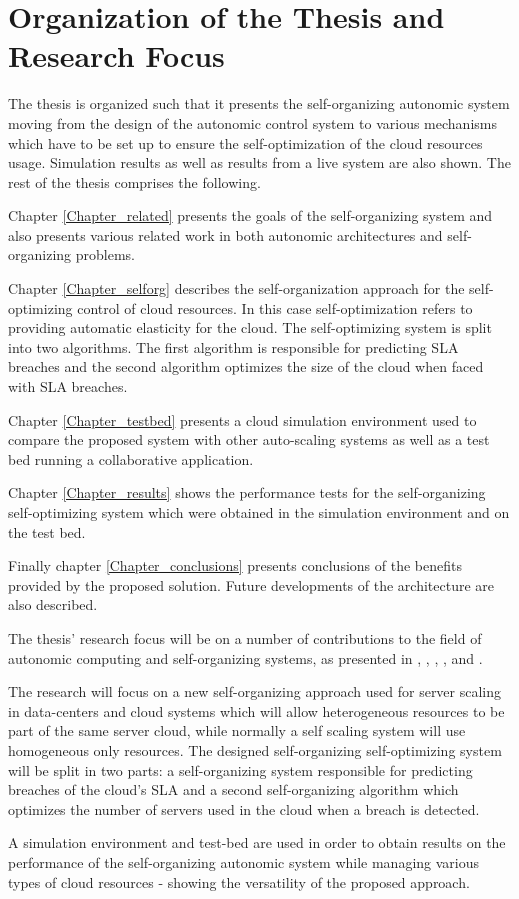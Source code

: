 \section{Organization of the Thesis and Research Focus}

The thesis is organized such that it presents the self-organizing autonomic system moving from the design of the autonomic control system to various mechanisms which have to be set up to ensure the self-optimization of the cloud resources usage. Simulation results as well as results from a live system are also shown. The rest of the thesis comprises the following.

Chapter \ref{Chapter_related} presents the goals of the self-organizing system and also presents various related work in both autonomic architectures and self-organizing problems.

Chapter \ref{Chapter_selforg} describes the self-organization approach for the self-optimizing control of cloud resources. In this case self-optimization refers to providing automatic elasticity for the cloud. The self-optimizing system is split into two algorithms. The first algorithm is responsible for predicting SLA breaches and the second algorithm optimizes the size of the cloud when faced with SLA breaches.

Chapter \ref{Chapter_testbed} presents a cloud simulation environment used to compare the proposed system with other auto-scaling systems as well as a test bed running a collaborative application.

Chapter \ref{Chapter_results} shows the performance tests for the self-organizing self-optimizing system which were obtained in the simulation environment and on the test bed.

Finally chapter \ref{Chapter_conclusions} presents conclusions of the benefits provided by the proposed solution. Future developments of the architecture are also described.

The thesis' research focus will be on a number of contributions to the field of autonomic computing and self-organizing systems, as presented in \cite{bogdan:lindi}, \cite{bogdan:amgcc2013}, \cite{bogdan:cts2012}, \cite{bogdan:conti2010}, \cite{bogdan:saci2013} and \cite{bogdan:miles2012chapter}. 

The research will focus on a new self-organizing approach used for server scaling in data-centers and cloud systems which will allow heterogeneous resources to be part of the same server cloud, while normally a self scaling system will use homogeneous only resources. The designed self-organizing self-optimizing system will be split in two parts: a self-organizing system responsible for predicting breaches of the cloud's SLA and a second self-organizing algorithm which optimizes the number of servers used in the cloud when a breach is detected.

A simulation environment and test-bed are used in order to obtain results on the performance of the self-organizing autonomic system while managing various types of cloud resources - showing the versatility of the proposed approach.